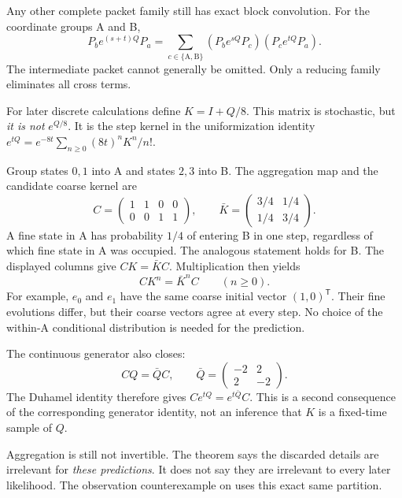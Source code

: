 Any other complete packet family still has exact block convolution. For the coordinate groups A and B,
\[
P_b e^{(s+t)Q}P_a=\sum_{c\in\{\mathrm A,\mathrm B\}}(P_b e^{sQ}P_c)(P_c e^{tQ}P_a).
\]
The intermediate packet cannot generally be omitted. Only a reducing family eliminates all cross terms.

For later discrete calculations define $K=I+Q/8$. This matrix is stochastic, but \emph{it is not} $e^{Q/8}$. It is the step kernel in the uniformization identity $e^{tQ}=e^{-8t}\sum_{n\ge0}(8t)^nK^n/n!$.

Group states $0,1$ into A and states $2,3$ into B. The aggregation map and the candidate coarse kernel are
\[
C=\begin{pmatrix}1&1&0&0\\0&0&1&1\end{pmatrix},\qquad
\bar K=\begin{pmatrix}3/4&1/4\\1/4&3/4\end{pmatrix}.
\]
A fine state in A has probability $1/4$ of entering B in one step, regardless of which fine state in A was occupied. The analogous statement holds for B.
The displayed columns give $CK=\bar KC$. Multiplication then yields
\[
CK^n=\bar K^nC\qquad(n\ge0).
\]
For example, $e_0$ and $e_1$ have the same coarse initial vector $(1,0)^{\mathsf T}$. Their fine evolutions differ, but their coarse vectors agree at every step. No choice of the within-A conditional distribution is needed for the prediction.

The continuous generator also closes:
\[
CQ=\bar Q C,\qquad
\bar Q=\begin{pmatrix}-2&2\\2&-2\end{pmatrix}.
\]
The Duhamel identity therefore gives $Ce^{tQ}=e^{t\bar Q}C$. This is a second consequence of the corresponding generator identity, not an inference that $K$ is a fixed-time sample of $Q$.

Aggregation is still not invertible. The theorem says the discarded details are irrelevant for \emph{these predictions}. It does not say they are irrelevant to every later likelihood. The observation counterexample on  uses this exact same partition.

